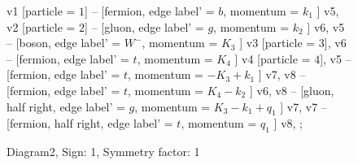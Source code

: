 \documentclass{revtex4}
\begin{document}
\begin{figure}[!htb]
\begin{center}
{    %
v1 [particle = \(1\)] -- [fermion, edge label' = \(b\), momentum = \(k_{1}\) ] v5, 
v2 [particle = \(2\)] -- [gluon, edge label' = \(g\), momentum = \(k_{2}\) ] v6, 
v5 -- [boson, edge label' = \(W^{-}\), momentum = \(K_{3}\) ] v3 [particle = \(3\)], 
v6 -- [fermion, edge label' = \(t\), momentum = \(K_{4}\) ] v4 [particle = \(4\)], 
v5 -- [fermion, edge label' = \(t\), momentum = \(-K_{3} + k_{1}\) ] v7, 
v8 -- [fermion, edge label' = \(t\), momentum = \(K_{4} - k_{2}\) ] v6, 
v8 -- [gluon, half right, edge label' = \(g\), momentum = \(K_{3} - k_{1} + q_{1}\) ] v7, 
v7 -- [fermion, half right, edge label' = \(t\), momentum = \(q_{1}\) ] v8, 
};
\end{center}
\caption{Diagram2, Sign: 1, Symmetry factor: 1}
\end{figure}
\newpage
\end{document}
